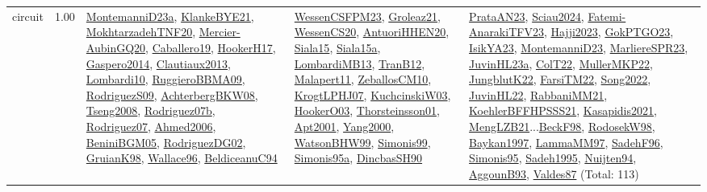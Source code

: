 {\begin{longtable}{p{3cm}r>{\raggedright\arraybackslash}p{6cm}>{\raggedright\arraybackslash}p{6cm}>{\raggedright\arraybackslash}p{8cm}}
\index{circuit}\index{Constraints!circuit}circuit &  1.00 & \hyperref[detail:MontemanniD23a]{MontemanniD23a}, \hyperref[detail:KlankeBYE21]{KlankeBYE21}, \hyperref[detail:MokhtarzadehTNF20]{MokhtarzadehTNF20}, \hyperref[detail:Mercier-AubinGQ20]{Mercier-AubinGQ20}, \hyperref[detail:Caballero19]{Caballero19}, \hyperref[detail:HookerH17]{HookerH17}, \hyperref[detail:Gaspero2014]{Gaspero2014}, \hyperref[detail:Clautiaux2013]{Clautiaux2013}, \hyperref[detail:Lombardi10]{Lombardi10}, \hyperref[detail:RuggieroBBMA09]{RuggieroBBMA09}, \hyperref[detail:RodriguezS09]{RodriguezS09}, \hyperref[detail:AchterbergBKW08]{AchterbergBKW08}, \hyperref[detail:Tseng2008]{Tseng2008}, \hyperref[detail:Rodriguez07b]{Rodriguez07b}, \hyperref[detail:Rodriguez07]{Rodriguez07}, \hyperref[detail:Ahmed2006]{Ahmed2006}, \hyperref[detail:BeniniBGM05]{BeniniBGM05}, \hyperref[detail:RodriguezDG02]{RodriguezDG02}, \hyperref[detail:GruianK98]{GruianK98}, \hyperref[detail:Wallace96]{Wallace96}, \hyperref[detail:BeldiceanuC94]{BeldiceanuC94} & \hyperref[detail:WessenCSFPM23]{WessenCSFPM23}, \hyperref[detail:Groleaz21]{Groleaz21}, \hyperref[detail:WessenCS20]{WessenCS20}, \hyperref[detail:AntuoriHHEN20]{AntuoriHHEN20}, \hyperref[detail:Siala15]{Siala15}, \hyperref[detail:Siala15a]{Siala15a}, \hyperref[detail:LombardiMB13]{LombardiMB13}, \hyperref[detail:TranB12]{TranB12}, \hyperref[detail:Malapert11]{Malapert11}, \hyperref[detail:ZeballosCM10]{ZeballosCM10}, \hyperref[detail:KrogtLPHJ07]{KrogtLPHJ07}, \hyperref[detail:KuchcinskiW03]{KuchcinskiW03}, \hyperref[detail:HookerO03]{HookerO03}, \hyperref[detail:Thorsteinsson01]{Thorsteinsson01}, \hyperref[detail:Apt2001]{Apt2001}, \hyperref[detail:Yang2000]{Yang2000}, \hyperref[detail:WatsonBHW99]{WatsonBHW99}, \hyperref[detail:Simonis99]{Simonis99}, \hyperref[detail:Simonis95a]{Simonis95a}, \hyperref[detail:DincbasSH90]{DincbasSH90} & \hyperref[detail:PrataAN23]{PrataAN23}, \hyperref[detail:Sciau2024]{Sciau2024}, \hyperref[detail:Fatemi-AnarakiTFV23]{Fatemi-AnarakiTFV23}, \hyperref[detail:Hajji2023]{Hajji2023}, \hyperref[detail:GokPTGO23]{GokPTGO23}, \hyperref[detail:IsikYA23]{IsikYA23}, \hyperref[detail:MontemanniD23]{MontemanniD23}, \hyperref[detail:MarliereSPR23]{MarliereSPR23}, \hyperref[detail:JuvinHL23a]{JuvinHL23a}, \hyperref[detail:ColT22]{ColT22}, \hyperref[detail:MullerMKP22]{MullerMKP22}, \hyperref[detail:JungblutK22]{JungblutK22}, \hyperref[detail:FarsiTM22]{FarsiTM22}, \hyperref[detail:Song2022]{Song2022}, \hyperref[detail:JuvinHL22]{JuvinHL22}, \hyperref[detail:RabbaniMM21]{RabbaniMM21}, \hyperref[detail:KoehlerBFFHPSSS21]{KoehlerBFFHPSSS21}, \hyperref[detail:Kasapidis2021]{Kasapidis2021}, \hyperref[detail:MengLZB21]{MengLZB21}...\hyperref[detail:BeckF98]{BeckF98}, \hyperref[detail:RodosekW98]{RodosekW98}, \hyperref[detail:Baykan1997]{Baykan1997}, \hyperref[detail:LammaMM97]{LammaMM97}, \hyperref[detail:SadehF96]{SadehF96}, \hyperref[detail:Simonis95]{Simonis95}, \hyperref[detail:Sadeh1995]{Sadeh1995}, \hyperref[detail:Nuijten94]{Nuijten94}, \hyperref[detail:AggounB93]{AggounB93}, \hyperref[detail:Valdes87]{Valdes87} (Total: 113)\\

\end{longtable}}
